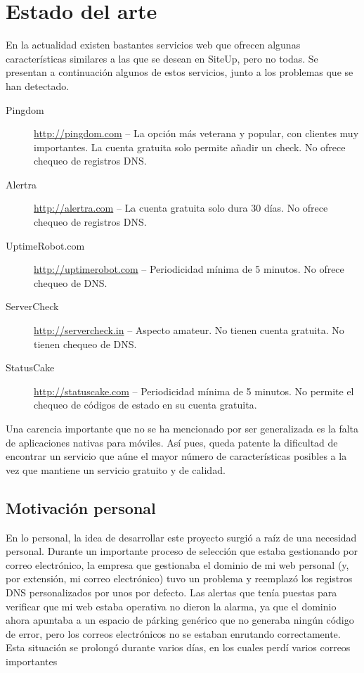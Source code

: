 \section{Estado del arte}

En la actualidad existen bastantes servicios web que ofrecen algunas
características similares a las que se desean en SiteUp, pero no todas. Se
presentan a continuación algunos de estos servicios, junto a los problemas que
se han detectado.

\begin{description}
\item[Pingdom] \url{http://pingdom.com} -- La opción más veterana y popular, con
  clientes muy importantes. La cuenta gratuita solo permite añadir un check. No
  ofrece chequeo de registros DNS.
\item[Alertra] \url{http://alertra.com} -- La cuenta gratuita solo dura 30
  días. No ofrece chequeo de registros DNS.
\item[UptimeRobot.com] \url{http://uptimerobot.com} -- Periodicidad mínima de 5
  minutos. No ofrece chequeo de DNS.
\item[ServerCheck] \url{http://servercheck.in} -- Aspecto amateur. No tienen
  cuenta gratuita. No tienen chequeo de DNS.
\item[StatusCake] \url{http://statuscake.com} -- Periodicidad mínima de 5
  minutos. No permite el chequeo de códigos de estado en su cuenta gratuita.

\end{description}

Una carencia importante que no se ha mencionado por ser generalizada es la falta
de aplicaciones nativas para móviles. Así pues, queda patente la dificultad de
encontrar un servicio que aúne el mayor número de características posibles a la
vez que mantiene un servicio gratuito y de calidad.

\subsection{Motivación personal}

En lo personal, la idea de desarrollar este proyecto surgió a raíz de una
necesidad personal. Durante un importante proceso de selección que estaba
gestionando por correo electrónico, la empresa que gestionaba el dominio de mi
web personal (y, por extensión, mi correo electrónico) tuvo un problema y
reemplazó los registros DNS personalizados por unos por defecto. Las alertas que
tenía puestas para verificar que mi web estaba operativa no dieron la alarma, ya
que el dominio ahora apuntaba a un espacio de párking genérico que no generaba
ningún código de error, pero los correos electrónicos no se estaban enrutando
correctamente. Esta situación se prolongó durante varios días, en los cuales
perdí varios correos importantes

